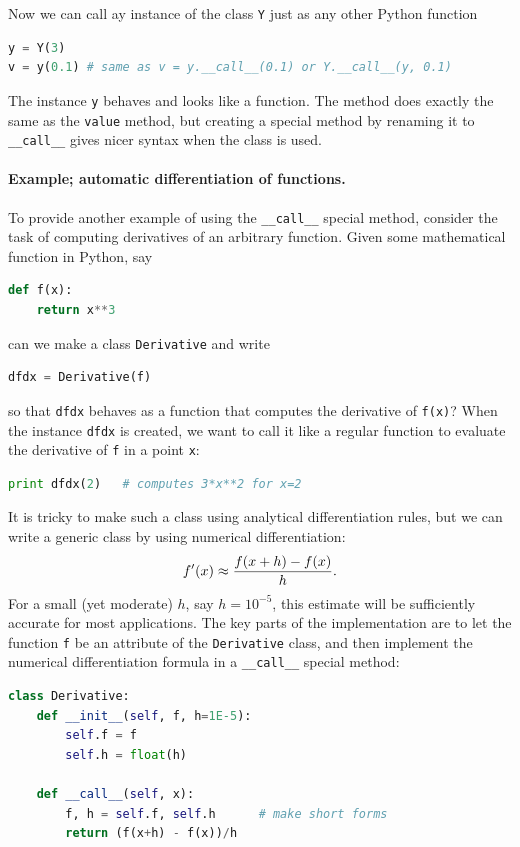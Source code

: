 \documentclass[graybox,envcountchap,sectrefs,final]{svmonodo}
\begin{document}
Now we can call ay instance of the class \texttt{Y} just as any other Python function
\begin{lstlisting}[language=Python,style=blue1]
y = Y(3)
v = y(0.1) # same as v = y.__call__(0.1) or Y.__call__(y, 0.1)
\end{lstlisting}
The instance \texttt{y} behaves and looks like a function. The method does exactly the same as the \texttt{value} method, but creating a
special method by renaming it
to \Verb!__call__! gives nicer syntax when the class is used.

\paragraph{Example; automatic differentiation of functions.}
To provide another example of using the \Verb!__call__! special method, consider the task of computing derivatives of an
arbitrary function. Given some mathematical function in Python, say
\begin{lstlisting}[language=Python,style=blue1]
def f(x):
    return x**3
\end{lstlisting}
can we make a class \texttt{Derivative} and write
\begin{lstlisting}[language=Python,style=blue1]
dfdx = Derivative(f)
\end{lstlisting}
so that \texttt{dfdx} behaves as a function that computes the derivative of \texttt{f(x)}? When the instance \texttt{dfdx} is created, we
want to call it like a regular function to evaluate the derivative of \texttt{f} in a point \texttt{x}:
\begin{lstlisting}[language=Python,style=blue1]
print dfdx(2)   # computes 3*x**2 for x=2
\end{lstlisting}
It is tricky to make such a class using analytical differentiation rules, but we can write a generic class by using
numerical differentiation:
\[ f'(x) \approx {f(x+h)-f(x)\over h} .\]
For a small (yet moderate) $h$, say $h=10^{-5}$, this estimate will be sufficiently accurate for most applications.
The key parts of the implementation are to let the function \texttt{f} be an attribute of the \texttt{Derivative} class, and then implement
the numerical differentiation formula in a \Verb!__call__! special method:
\begin{lstlisting}[language=Python,style=blue1]
class Derivative:
    def __init__(self, f, h=1E-5):
        self.f = f
        self.h = float(h)

    def __call__(self, x):
        f, h = self.f, self.h      # make short forms
        return (f(x+h) - f(x))/h
\end{lstlisting}
\end{document}
